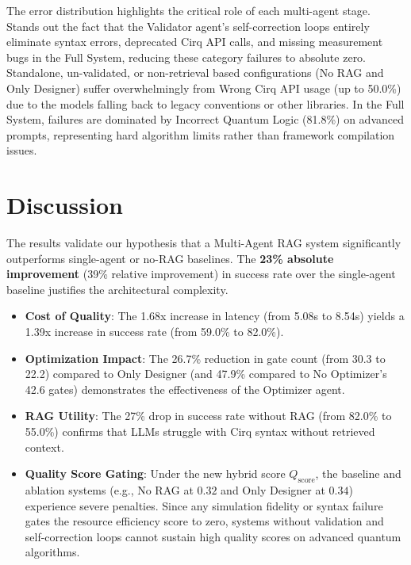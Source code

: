 \documentclass[runningheads]{llncs}
\begin{document}
The error distribution highlights the critical role of each multi-agent stage. Stands out the fact that the Validator agent's self-correction loops entirely eliminate syntax errors, deprecated Cirq API calls, and missing measurement bugs in the Full System, reducing these category failures to absolute zero. Standalone, un-validated, or non-retrieval based configurations (No RAG and Only Designer) suffer overwhelmingly from Wrong Cirq API usage (up to 50.0\%) due to the models falling back to legacy conventions or other libraries. In the Full System, failures are dominated by Incorrect Quantum Logic (81.8\%) on advanced prompts, representing hard algorithm limits rather than framework compilation issues.

\section{Discussion}
The results validate our hypothesis that a Multi-Agent RAG system significantly outperforms single-agent or no-RAG baselines. The \textbf{23\% absolute improvement} (39\% relative improvement) in success rate over the single-agent baseline justifies the architectural complexity.
\begin{itemize}
    \item \textbf{Cost of Quality}: The 1.68x increase in latency (from 5.08s to 8.54s) yields a 1.39x increase in success rate (from 59.0\% to 82.0\%).
    \item \textbf{Optimization Impact}: The 26.7\% reduction in gate count (from 30.3 to 22.2) compared to Only Designer (and 47.9\% compared to No Optimizer's 42.6 gates) demonstrates the effectiveness of the Optimizer agent.
    \item \textbf{RAG Utility}: The 27\% drop in success rate without RAG (from 82.0\% to 55.0\%) confirms that LLMs struggle with Cirq syntax without retrieved context.
    \item \textbf{Quality Score Gating}: Under the new hybrid score $Q_{\text{score}}$, the baseline and ablation systems (e.g., No RAG at $0.32$ and Only Designer at $0.34$) experience severe penalties. Since any simulation fidelity or syntax failure gates the resource efficiency score to zero, systems without validation and self-correction loops cannot sustain high quality scores on advanced quantum algorithms.
\end{itemize}
\end{document}
